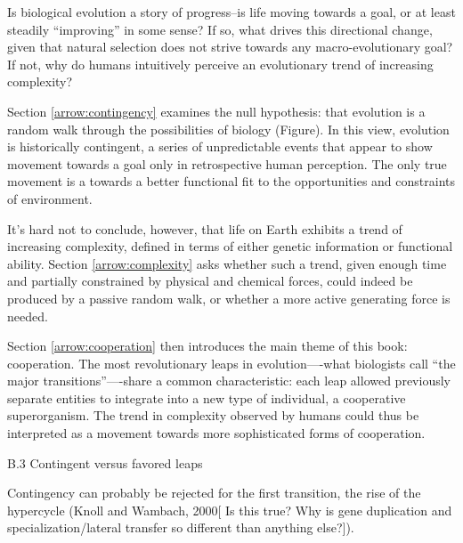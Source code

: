 \documentclass{tufte-book} %
\begin{document}
Is biological evolution a story of progress--is life moving towards a goal, or at least steadily “improving” in some sense? If so, what drives this directional change, given that natural selection does not strive towards any macro-evolutionary goal? If not, why do humans intuitively perceive an evolutionary trend of increasing complexity?

Section \ref{arrow:contingency} examines the null hypothesis: that evolution is a random walk through the possibilities of biology (Figure). In this view, evolution is historically contingent, a series of unpredictable events that appear to show movement towards a goal only in retrospective human perception. The only true movement is a towards a better functional fit to the opportunities and constraints of environment. %

It’s hard not to conclude, however, that life on Earth exhibits a trend of increasing complexity, defined in terms of either genetic information or functional ability. %
Section \ref{arrow:complexity} asks whether such a trend, given enough time and partially constrained by physical and chemical forces, could indeed be produced by a passive random walk, or whether a more active generating force is needed. %

Section \ref{arrow:cooperation} then introduces the main theme of this book: cooperation. The most revolutionary leaps in evolution—-what biologists call “the major transitions”—-share a common characteristic: each leap allowed previously separate entities to integrate into a new type of individual, a cooperative superorganism. The trend in complexity observed by humans could thus be interpreted as a movement towards more sophisticated forms of cooperation. 



B.3  Contingent versus favored leaps


Contingency can probably be rejected for the first transition, the rise of the hypercycle (Knoll and Wambach, 2000[ Is this true? Why is gene duplication and specialization/lateral transfer so different than anything else?]).
\end{document}

